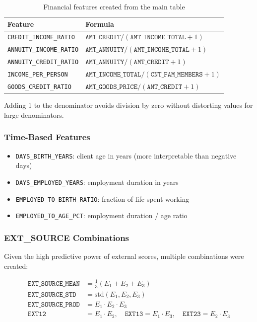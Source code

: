 \documentclass[12pt, a4paper]{article}
\begin{document}
\begin{table}[H]
\centering
\begin{tabular}{ll}
\toprule
\textbf{Feature} & \textbf{Formula} \\
\midrule
\texttt{CREDIT\_INCOME\_RATIO}  & $\texttt{AMT\_CREDIT} / (\texttt{AMT\_INCOME\_TOTAL} + 1)$ \\
\texttt{ANNUITY\_INCOME\_RATIO} & $\texttt{AMT\_ANNUITY} / (\texttt{AMT\_INCOME\_TOTAL} + 1)$ \\
\texttt{ANNUITY\_CREDIT\_RATIO} & $\texttt{AMT\_ANNUITY} / (\texttt{AMT\_CREDIT} + 1)$ \\
\texttt{INCOME\_PER\_PERSON}    & $\texttt{AMT\_INCOME\_TOTAL} / (\texttt{CNT\_FAM\_MEMBERS} + 1)$ \\
\texttt{GOODS\_CREDIT\_RATIO}   & $\texttt{AMT\_GOODS\_PRICE} / (\texttt{AMT\_CREDIT} + 1)$ \\
\bottomrule
\end{tabular}
\caption{Financial features created from the main table}
\end{table}

Adding 1 to the denominator avoids division by zero without distorting values for
large denominators.

\subsubsection{Time-Based Features}

\begin{itemize}
    \item \texttt{DAYS\_BIRTH\_YEARS}: client age in years (more interpretable than
          negative days)
    \item \texttt{DAYS\_EMPLOYED\_YEARS}: employment duration in years
    \item \texttt{EMPLOYED\_TO\_BIRTH\_RATIO}: fraction of life spent working
    \item \texttt{EMPLOYED\_TO\_AGE\_PCT}: employment duration / age ratio
\end{itemize}

\subsubsection{EXT\_SOURCE Combinations}

Given the high predictive power of external scores, multiple combinations were created:

\begin{align}
    \texttt{EXT\_SOURCE\_MEAN} &= \tfrac{1}{3}(E_1 + E_2 + E_3) \\
    \texttt{EXT\_SOURCE\_STD}  &= \text{std}(E_1, E_2, E_3) \\
    \texttt{EXT\_SOURCE\_PROD} &= E_1 \cdot E_2 \cdot E_3 \\
    \texttt{EXT12} &= E_1 \cdot E_2, \quad
    \texttt{EXT13} = E_1 \cdot E_3, \quad
    \texttt{EXT23} = E_2 \cdot E_3
\end{align}
\end{document}
